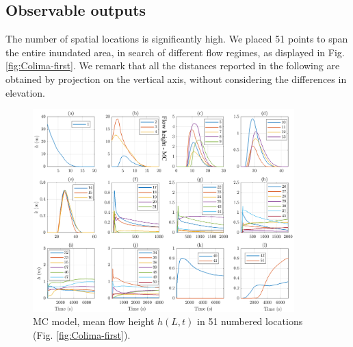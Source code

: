 \documentclass{article}
\begin{document}

\subsection{Observable outputs}
The number of spatial locations is significantly high. We placed 51 points to span the entire inundated area, in search of different flow regimes, as displayed in Fig. \ref{fig:Colima-first}. We remark that all the distances reported in the following are obtained by projection on the vertical axis, without considering the differences in elevation.
\begin{figure}[H]
         \centering
        \includegraphics[width=0.9\textwidth]{MC&VS_51/Height_MC2.png}
        \caption{MC model, mean flow height $h(L,t)$ in 51 numbered locations (Fig. \ref{fig:Colima-first}).}
        \label{fig:BAF-H-MC}
\end{figure}
\end{document}
